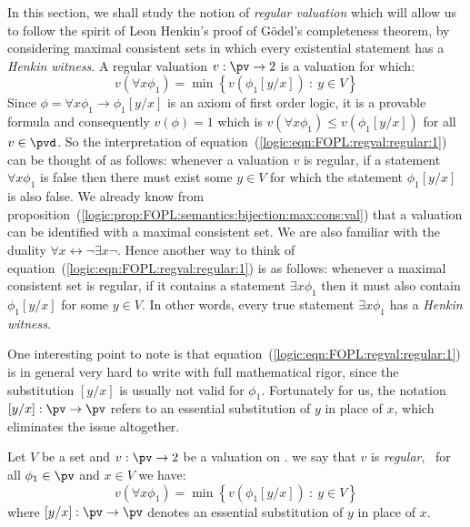 In this section, we shall study the notion of {\em regular
valuation} which will allow us to follow the spirit of Leon Henkin's
proof of G\"odel's completeness theorem, by considering maximal
consistent sets in which every existential statement has a {\em
Henkin witness}. A regular valuation $v:\pv\to 2$ is a valuation for
which:
    \begin{equation}\label{logic:eqn:FOPL:regval:regular:1}
    v(\forall x\phi_{1})=\min\left\{v(\phi_{1}[y/x])\ :\ y\in V\right\}
    \end{equation}
Since $\phi=\forall x\phi_{1}\to\phi_{1}[y/x]$ is an axiom of first
order logic, it is a provable formula and consequently $v(\phi)=1$
which is $v(\forall x\phi_{1})\leq v(\phi_{1}[y/x])$ for all
$v\in\pvd$. So the interpretation of
equation~(\ref{logic:eqn:FOPL:regval:regular:1}) can be thought of
as follows: whenever a valuation $v$ is regular, if a statement
$\forall x\phi_{1}$ is false then there must exist some $y\in V$ for
which the statement $\phi_{1}[y/x]$ is also false. We already know
from
proposition~(\ref{logic:prop:FOPL:semantics:bijection:max:cons:val})
that a valuation can be identified with a maximal consistent set. We
are also familiar with the duality $\forall
x\leftrightarrow\lnot\exists x\lnot$. Hence another way to think of
equation~(\ref{logic:eqn:FOPL:regval:regular:1}) is as follows:
whenever a maximal consistent set is regular, if it contains a
statement $\exists x\phi_{1}$ then it must also contain
$\phi_{1}[y/x]$ for some $y\in V$. In other words, every true
statement $\exists x\phi_{1}$ has a {\em Henkin witness}.

One interesting point to note is that
equation~(\ref{logic:eqn:FOPL:regval:regular:1}) is in general very
hard to write with full mathematical rigor, since the substitution
$[y/x]$ is usually not valid for $\phi_{1}$. Fortunately for us, the
notation $[y/x]:\pv\to\pv$ refers to an essential substitution of
$y$ in place of $x$, which eliminates the issue altogether.

\begin{defin}\label{logic:def:FOPL:regval:regular}
Let $V$ be a set and $v:\pv\to 2$ be a valuation on \pv. we say that
$v$ is {\em regular}, \ifand\ for all $\phi_{1}\in\pv$ and $x\in V$
we have:
    \[
    v(\forall x\phi_{1})=\min\left\{v(\phi_{1}[y/x])\ :\ y\in V\right\}
    \]
where $[y/x]:\pv\to\pv$ denotes an essential substitution of $y$ in
place of $x$.
\end{defin}

